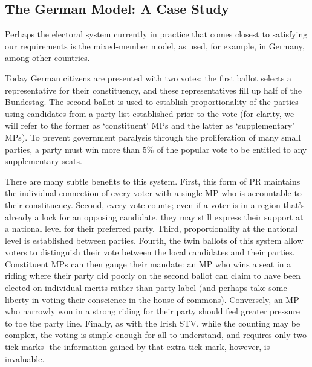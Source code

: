 \documentclass[DIV=calc, paper=a4, fontsize=11pt, twocolumn]{scrartcl}	 %
\begin{document}
\subsection{The German Model: A Case Study}
\label{sec:german_model}

Perhaps the electoral system currently in practice that comes closest to satisfying our requirements is the mixed-member model, as used, for example, in Germany, among other countries.

Today German citizens are presented with two votes: the first ballot selects a representative for their constituency, and these representatives fill up half of the Bundestag. The second ballot is used to establish proportionality of the parties using candidates from a party list established prior to the vote
(for clarity, we will refer to the former as `constituent' MPs  and the latter as `supplementary' MPs).
To prevent government paralysis through the proliferation of many small parties, a party must win more than 5\% of the popular vote to be entitled to any supplementary seats.

There are many subtle benefits to this system. 
First, this form of PR maintains the individual connection of every voter with a single MP who is accountable to their constituency.
Second, every vote counts; even if a voter is in a region that's already a lock for an opposing candidate, they may still express their support at a national level for their preferred party.
Third, proportionality at the national level is established between parties.
Fourth, the twin ballots of this system allow voters to distinguish their vote between the local candidates and their parties.  Constituent MPs can then gauge their mandate: an MP who wins a seat in a riding where their party did poorly on the second ballot can claim to have been elected on individual merits rather than party label (and perhaps take some liberty in voting their conscience in the house of commons). Conversely, an MP who narrowly won in a strong riding for their party should feel greater pressure to toe the party line.
Finally, as with the Irish STV, while the counting may be complex, the voting is simple enough for all to understand, and requires only two tick marks \--the information gained by that extra tick mark, however, is invaluable.
\end{document}
